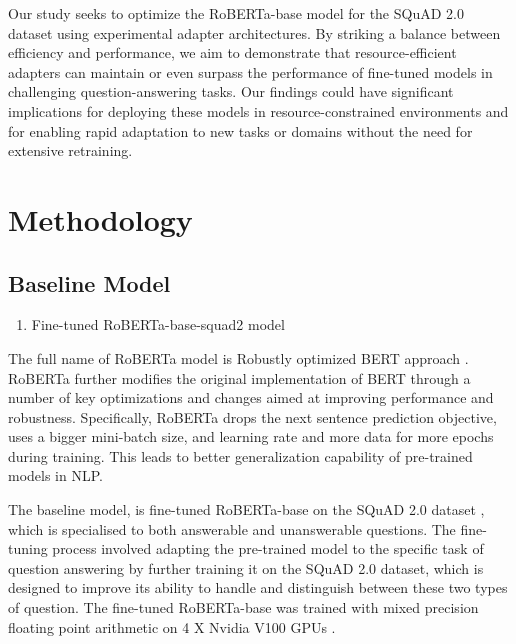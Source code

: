 \documentclass[conference]{IEEEtran}
\begin{document}
Our study seeks to optimize the RoBERTa-base model for the SQuAD 2.0 dataset using experimental adapter architectures. By striking a balance between efficiency and performance, we aim to demonstrate that resource-efficient adapters can maintain or even surpass the performance of fine-tuned models in challenging question-answering tasks. Our findings could have significant implications for deploying these models in resource-constrained environments and for enabling rapid adaptation to new tasks or domains without the need for extensive retraining.



\section{Methodology}


\subsection{Baseline Model}

\begin{enumerate}
    \item Fine-tuned RoBERTa-base-squad2 model
\end{enumerate}

The full name of RoBERTa model is Robustly optimized BERT approach \cite{b4}. RoBERTa further modifies the original implementation of BERT through a number of key optimizations and changes aimed at improving performance and robustness. Specifically, RoBERTa drops the next sentence prediction objective, uses a bigger mini-batch size, and learning rate and more data for more epochs during training. This leads to better generalization capability of pre-trained models in NLP.

The baseline model, is fine-tuned RoBERTa-base on the SQuAD 2.0 dataset \cite{b16}, which is specialised to both answerable and unanswerable questions. The fine-tuning process involved adapting the pre-trained model to the specific task of question answering by further training it on the SQuAD 2.0 dataset, which is designed to improve its ability to handle and distinguish between these two types of question.
The fine-tuned RoBERTa-base was trained with mixed precision floating point arithmetic on 4 X Nvidia V100 GPUs \cite{b16}.
\end{document}
